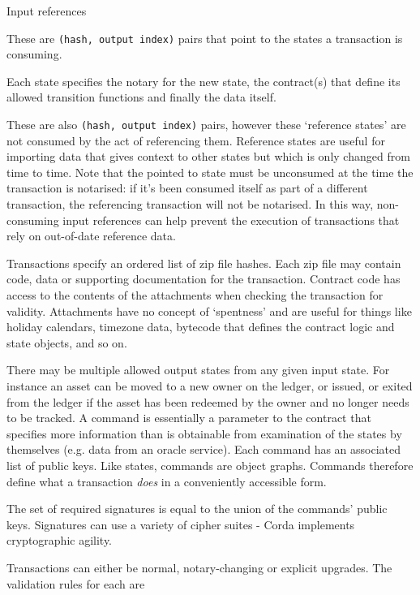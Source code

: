 \documentclass{article}
\begin{document}
\begin{labeling}{Input references}
\item [Consuming input references.] These are \texttt{(hash, output index)} pairs that point to the states a
transaction is consuming.
\item [Output states.] Each state specifies the notary for the new state, the contract(s) that define its allowed
transition functions and finally the data itself.
\item [Non-consuming input references.] These are also \texttt{(hash, output index)} pairs, however these `reference
states' are not consumed by the act of referencing them. Reference states are useful for importing data that gives
context to other states but which is only changed from time to time. Note that the pointed to state must be unconsumed
at the time the transaction is notarised: if it's been consumed itself as part of a different transaction, the referencing
transaction will not be notarised. In this way, non-consuming input references can help prevent the execution of
transactions that rely on out-of-date reference data.
\item [Attachments.] Transactions specify an ordered list of zip file hashes. Each zip file may contain
code, data or supporting documentation for the transaction. Contract code has access to the contents
of the attachments when checking the transaction for validity. Attachments have no concept of `spentness' and are useful
for things like holiday calendars, timezone data, bytecode that defines the contract logic and state objects, and so on.
\item [Commands.] There may be multiple allowed output states from any given input state. For instance
an asset can be moved to a new owner on the ledger, or issued, or exited from the ledger if the asset has been
redeemed by the owner and no longer needs to be tracked. A command is essentially a parameter to the contract
that specifies more information than is obtainable from examination of the states by themselves (e.g. data from an oracle
service). Each command has an associated list of public keys. Like states, commands are object graphs. Commands therefore
define what a transaction \emph{does} in a conveniently accessible form.
\item [Signatures.] The set of required signatures is equal to the union of the commands' public keys. Signatures can use
a variety of cipher suites - Corda implements cryptographic agility.
\item [Type.] Transactions can either be normal, notary-changing or explicit upgrades. The validation rules for each are

\end{labeling}
\end{document}
